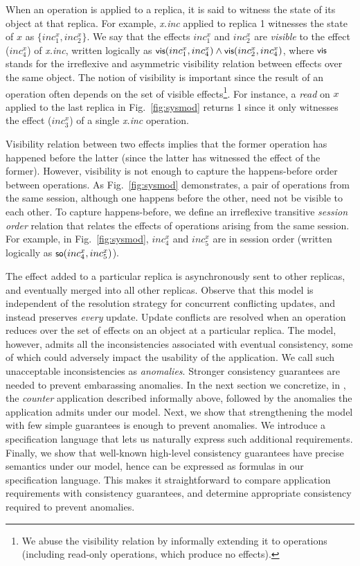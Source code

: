 When an operation is applied to a replica, it is said to witness the
state of its object at that replica. For example, \emph{x.inc} applied
to replica 1 witnesses the state of $x$ as $\{inc^x_1,inc^x_2\}$.  We
say that the effects $inc^x_1$ and $inc^x_2$ are \emph{visible} to the
effect ($inc^x_4$) of \emph{x.inc}, written logically as $\small
{\normalfont \textsf{vis}(inc^x_1,inc^x_4)} \wedge {\normalfont \textsf{vis}(inc^x_2,inc^x_4)}$, where $\small
{\normalfont \textsf{vis}}$ stands for the irreflexive and asymmetric visibility relation
between effects over the same object. The notion of visibility is
important since the result of an operation often depends on the set of
visible effects\footnote{We abuse the visibility relation by
informally extending it to operations (including read-only operations,
which produce no effects).}. For instance, a \emph{read} on $x$
applied to the last replica in Fig.~\ref{fig:sysmod} returns 1 since
it only witnesses the effect ($inc^x_3$) of a single \emph{x.inc}
operation. 

Visibility relation between two effects implies that the former
operation has happened before the latter (since the latter has
witnessed the effect of the former). However, visibility is not enough
to capture the happens-before order between operations. As
Fig.~\ref{fig:sysmod} demonstrates, a pair of operations from the same
session, although one happens before the other, need not be visible to
each other. To capture happens-before, we define an irreflexive
transitive \emph{session order} relation that relates the effects of
operations arising from the same session. For example, in
Fig.~\ref{fig:sysmod}, $inc^x_4$ and $inc^x_5$ are in session order
(written logically as $\small {\normalfont \textsf{so}(inc^x_4,inc^x_5)}$). 

The effect added to a particular replica is asynchronously sent to
other replicas, and eventually merged into all other replicas. Observe
that this model is independent of the resolution strategy for
concurrent conflicting updates, and instead preserves \emph{every}
update. Update conflicts are resolved when an operation reduces over
the set of effects on an object at a particular replica. The model,
however, admits all the inconsistencies associated with eventual
consistency, some of which could adversely impact the usability of the
application. We call such unacceptable inconsistencies as
\emph{anomalies}. Stronger consistency guarantees are needed to
prevent embarassing anomalies. In the next section we concretize, in
\name, the \emph{counter} application described informally above,
followed by the anomalies the application admits under our model.
Next, we show that strengthening the model with few simple guarantees
is enough to prevent anomalies. We introduce a specification language
that lets us naturally express such additional requirements. Finally,
we show that well-known high-level consistency guarantees have precise
semantics under our model, hence can be expressed as formulas in our
specification language. This makes it straightforward to compare
application requirements with consistency guarantees, and determine
appropriate consistency required to prevent anomalies. 

